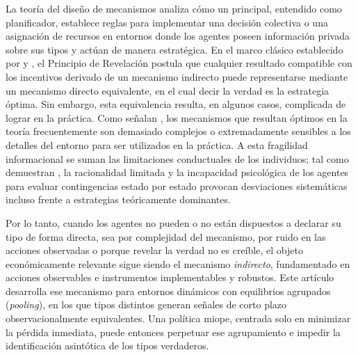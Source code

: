 \documentclass[pdflatex,sn-mathphys-ay]{sn-jnl}
\theoremstyle{thmstyleone}
\theoremstyle{thmstyletwo}
\theoremstyle{thmstylethree}
\newcommand{\1}{\mathbf{1}}
\begin{document}
La teoría del diseño de mecanismos analiza cómo un principal, entendido como planificador, establece reglas para implementar una decisión colectiva o una asignación de recursos en entornos donde los agentes poseen información privada sobre sus tipos y actúan de manera estratégica. En el marco clásico establecido por \citet{Gibbard1973} y \citet{Myerson1979IC,Myerson1981}, el Principio de Revelación postula que cualquier resultado compatible con los incentivos derivado de un mecanismo indirecto puede representarse mediante un mecanismo directo equivalente, en el cual decir la verdad es la estrategia óptima. Sin embargo, esta equivalencia resulta, en algunos casos, complicada de lograr en la práctica. Como señalan \citet{BergemannMorris2012}, los mecanismos que resultan óptimos en la teoría frecuentemente son demasiado complejos o extremadamente sensibles a los detalles del entorno para ser utilizados en la práctica. A esta fragilidad informacional se suman las limitaciones conductuales de los individuos; tal como demuestran \citet{ZhangLevin2017}, la racionalidad limitada y la incapacidad psicológica de los agentes para evaluar contingencias estado por estado provocan desviaciones sistemáticas incluso frente a estrategias teóricamente dominantes.

Por lo tanto, cuando los agentes no pueden o no están dispuestos a declarar su tipo de forma directa, sea por complejidad del mecanismo, por ruido en las acciones observadas o porque revelar la verdad no es creíble, el objeto económicamente relevante sigue siendo el mecanismo \emph{indirecto}, fundamentado en acciones observables e instrumentos implementables y robustos. Este artículo desarrolla ese mecanismo para entornos dinámicos con equilibrios agrupados (\emph{pooling}), en los que tipos distintos generan señales de corto plazo observacionalmente equivalentes. Una política miope, centrada solo en minimizar la pérdida inmediata, puede entonces perpetuar ese agrupamiento e impedir la identificación asintótica de los tipos verdaderos.
\end{document}
